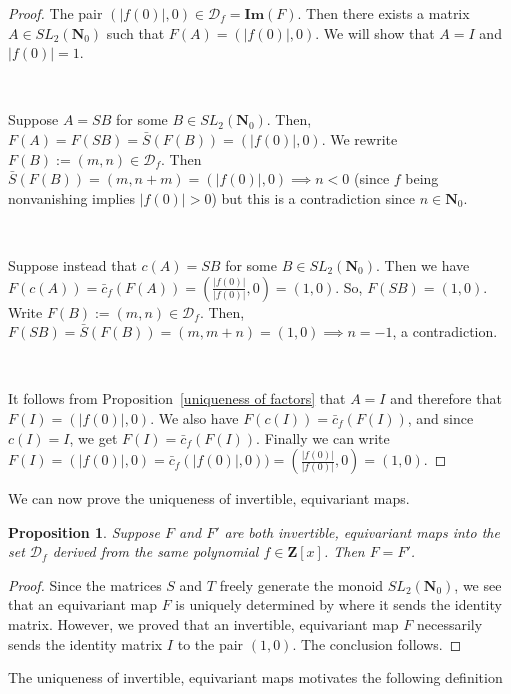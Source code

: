 \documentclass{article}
\newtheorem{proposition}[theorem]{Proposition}  %
\begin{document}
\begin{proof}
The pair $(|f(0)|, 0) \in \mathcal{D}_f = \mathbf{Im}(F)$. Then there exists a matrix $A \in SL_2(\mathbf{N}_0)$ such that $F(A) = (|f(0)|, 0)$. We will show that $A = I$ and $|f(0)| = 1$. 

\

Suppose $A = SB$ for some $B \in SL_2(\mathbf{N}_0)$. Then, $F(A) = F(SB) = \bar{S}(F(B)) = (|f(0)|, 0)$. We rewrite $F(B) := (m, n) \in \mathcal{D}_f$. Then $\bar{S}(F(B)) = (m, n+m) = (|f(0)|, 0) \implies n < 0$ (since $f$ being nonvanishing implies $|f(0)|  
> 0$) but this is a contradiction since $n \in \mathbf{N}_0$.

\

Suppose instead that $c(A) = SB$ for some $B \in SL_2(\mathbf{N}_0)$. Then we have $F(c(A)) = \bar{c}_f(F(A)) = (\frac{|f(0)|}{|f(0)|}, 0) = (1,0)$. So, $F(SB) = (1,0)$. Write $F(B) := (m, n) \in \mathcal{D}_f$. Then, $F(SB) =  \bar{S}(F(B)) = (m, m+n) = (1,0) \implies n = -1$, a contradiction.

\

It follows from Proposition~\ref{uniqueness of factors}  that $A = I$ and therefore that $F(I) = (|f(0)|, 0)$. We also have $F\left(c(I)\right) = \bar{c}_f\left(F(I)\right)$, and since $c(I) = I$, we get $F(I) = \bar{c}_f\left(F(I)\right)$. Finally we can write $F(I) = (|f(0)|, 0) = \bar{c}_f(|f(0)|, 0)) = (\frac{|f(0)|}{|f(0)|}, 0) = (1, 0)$.
\end{proof}

We can now prove the uniqueness of invertible, equivariant maps.

\begin{proposition}\label{uniqueness of st pres map}
Suppose $F$ and $F'$ are both invertible, equivariant maps into the set $\mathcal{D}_f$ derived from the same polynomial $f \in \mathbf{Z}[x]$. Then $F = F'$.
\end{proposition}

\begin{proof}
Since the matrices $S$ and $T$ freely generate the monoid $SL_2(\mathbf{N}_0)$, we see that an equivariant map $F$ is uniquely determined by where it sends the identity matrix. However, we proved that an invertible, equivariant map $F$ necessarily sends the identity matrix $I$ to the pair $(1,0)$. The conclusion follows.
\end{proof}

The uniqueness of invertible, equivariant maps motivates the following definition
\end{document}
